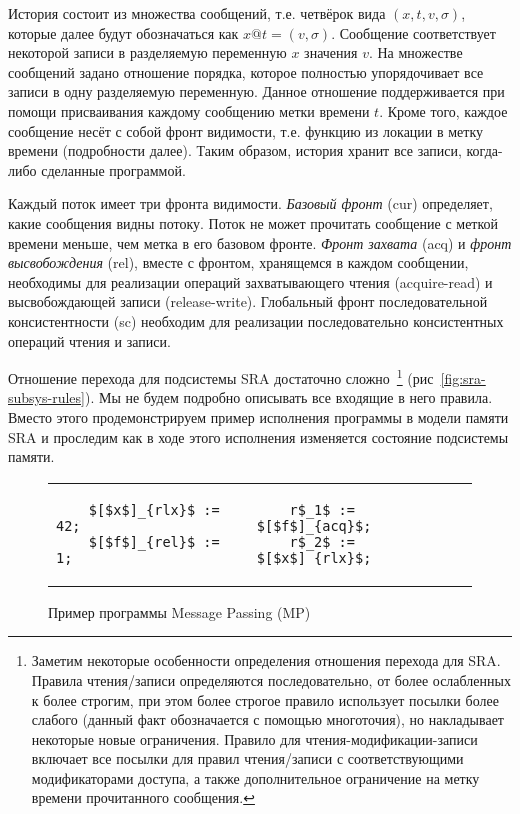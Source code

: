История состоит из множества сообщений, 
т.е. четвёрок вида $(x, t, v, \sigma)$,
которые далее будут обозначаться как $x@t=(v, \sigma)$.
Сообщение соответствует некоторой записи в разделяемую переменную $x$ значения $v$.
На множестве сообщений задано отношение порядка,
которое полностью упорядочивает все записи в одну разделяемую переменную.
Данное отношение поддерживается при помощи присваивания 
каждому сообщению метки времени $t$.
Кроме того, каждое сообщение несёт с собой фронт видимости,
т.е. функцию из локации в метку времени (подробности далее).
Таким образом, история хранит все записи, когда-либо сделанные программой.

Каждый поток имеет три фронта видимости.
\emph{Базовый фронт} (cur) определяет, какие сообщения видны потоку.
Поток не может прочитать сообщение с меткой времени меньше, 
чем метка в его базовом фронте.
\emph{Фронт захвата} (acq) и \emph{фронт высвобождения} (rel),
вместе с фронтом, хранящемся в каждом сообщении,
необходимы для реализации операций захватывающего чтения (acquire-read) 
и высвобождающей записи (release-write).
Глобальный фронт последовательной консистентности (sc)
необходим для реализации последовательно консистентных операций чтения и записи.

Отношение перехода для подсистемы SRA достаточно сложно~\footnote{
  Заметим некоторые особенности определения отношения перехода для SRA.
  Правила чтения/записи определяются последовательно, от более ослабленных к более 
  строгим, при этом более строгое правило использует посылки более слабого
  (данный факт обозначается с помощью многоточия), но накладывает некоторые новые ограничения.
  Правило для чтения-модификации-записи включает все посылки 
  для правил чтения/записи с соответствующими модификаторами доступа, 
  а также дополнительное ограничение на метку времени прочитанного сообщения.
}
(рис~\ref{fig:sra-subsys-rules}).
Мы не будем подробно описывать все входящие в него правила.
Вместо этого продемонстрируем пример исполнения программы в модели памяти SRA
и проследим как в ходе этого исполнения изменяется состояние подсистемы памяти.

\begin{figure}[htp]
\centering
    \begin{tabular}{l|@{\hskip 5pt}|@{\hskip -15pt}l}
    \begin{lstlisting}
    $[$x$]_{rlx}$ := 42;
    $[$f$]_{rel}$ := 1;
    \end{lstlisting}
    &
    \begin{lstlisting}
    r$_1$ := $[$f$]_{acq}$;
    r$_2$ := $[$x$]_{rlx}$;
    \end{lstlisting}
    \\
    \end{tabular}
    \caption{Пример программы Message Passing (MP)}
    \label{lst:mp-ex-2}
\end{figure}

